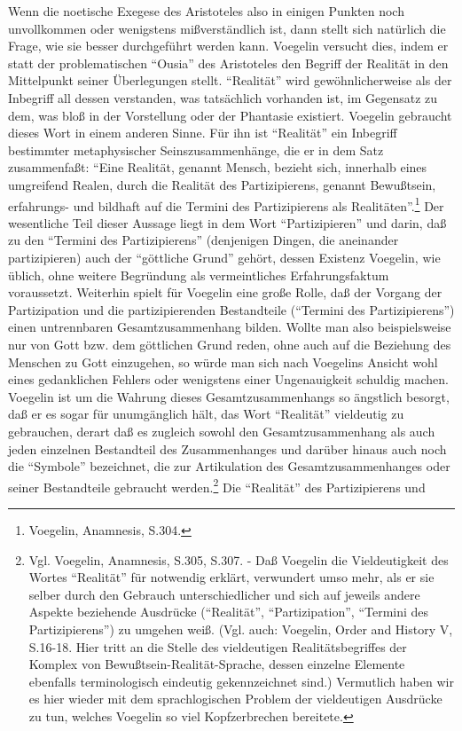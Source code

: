 Wenn die noetische Exegese des Aristoteles also in einigen Punkten noch
unvollkommen oder wenigstens mißverständlich ist, dann stellt sich
natürlich die Frage, wie sie besser durchgeführt werden kann. Voegelin
versucht dies, indem er statt der problematischen "`Ousia"' des
Aristoteles den Begriff der Realität in den Mittelpunkt seiner
Überlegungen stellt. "`Realität"' wird gewöhnlicherweise als der
Inbegriff all dessen verstanden, was tatsächlich vorhanden ist, im
Gegensatz zu dem, was bloß in der Vorstellung oder der Phantasie
existiert.  Voegelin gebraucht dieses Wort in einem anderen Sinne.  Für
ihn ist "`Realität"' ein Inbegriff bestimmter metaphysischer
Seinszusammenhänge, die er in dem Satz zusammenfaßt: "`Eine Realität,
genannt Mensch, bezieht sich, innerhalb eines umgreifend Realen, durch
die Realität des Partizipierens, genannt Bewußtsein, erfahrungs- und
bildhaft auf die Termini des Partizipierens als
Realitäten"'.\footnote{Voegelin, Anamnesis, S.304.} Der wesentliche Teil
dieser Aussage liegt in dem Wort "`Partizipieren"' und darin, daß zu den
"`Termini des Partizipierens"' (denjenigen Dingen, die aneinander
partizipieren) auch der "`göttliche Grund"' gehört, dessen Existenz
Voegelin, wie üblich, ohne weitere Begründung als vermeintliches
Erfahrungsfaktum voraussetzt. Weiterhin spielt für Voegelin eine große
Rolle, daß der Vorgang der Partizipation und die partizipierenden
Bestandteile ("`Termini des Partizipierens"') einen untrennbaren
Gesamtzusammenhang bilden. Wollte man also beispielsweise nur von Gott
bzw.  dem göttlichen Grund reden, ohne auch auf die Beziehung des
Menschen zu Gott einzugehen, so würde man sich nach Voegelins Ansicht
wohl eines gedanklichen Fehlers oder wenigstens einer Ungenauigkeit
schuldig machen.  Voegelin ist um die Wahrung dieses Gesamtzusammenhangs
so ängstlich besorgt, daß er es sogar für unumgänglich hält, das Wort
"`Realität"' vieldeutig zu gebrauchen, derart daß es zugleich sowohl den
Gesamtzusammenhang als auch jeden einzelnen Bestandteil des
Zusammenhanges und darüber hinaus auch noch die "`Symbole"' bezeichnet,
die zur Artikulation des Gesamtzusammenhanges oder seiner Bestandteile
gebraucht werden.\footnote{Vgl.  Voegelin, Anamnesis, S.305, S.307. -
  Daß Voegelin die Vieldeutigkeit des Wortes "`Realität"' für notwendig
  erklärt, verwundert umso mehr, als er sie selber durch den Gebrauch
  unterschiedlicher und sich auf jeweils andere Aspekte beziehende
  Ausdrücke ("`Realität"', "`Partizipation"', "`Termini des
  Partizipierens"') zu umgehen weiß. (Vgl. auch: Voegelin, Order and
  History V, S.16-18. Hier tritt an die Stelle des vieldeutigen
  Realitätsbegriffes der Komplex von Bewußtsein-Realität-Sprache, dessen
  einzelne Elemente ebenfalls terminologisch eindeutig gekennzeichnet
  sind.)  Vermutlich haben wir es hier wieder mit dem sprachlogischen
  Problem der vieldeutigen Ausdrücke zu tun, welches Voegelin so viel
  Kopfzerbrechen bereitete.} Die "`Realität"' des Partizipierens und

